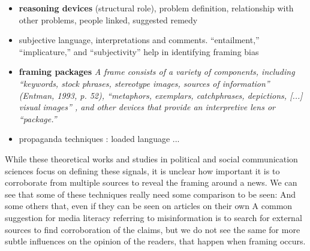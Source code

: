 \begin{itemize}
    \item \textbf{reasoning devices} (structural role), problem definition, relationship with other problems, people linked, suggested remedy \cite{entman1993framing} 
    
    \item subjective language, interpretations and comments. “entailment,” “implicature,” and “subjectivity” help in identifying framing bias \cite{baumer2015testing}
    
    \item \textbf{framing packages}  \textit{A frame consists of a variety of components, including “keywords, stock phrases, stereotype images, sources of information” (Entman, 1993, p. 52), “metaphors, exemplars, catchphrases, depictions, [...] visual images” \cite{gamson1989media}, and other devices that provide an interpretive lens or “package.”}
    
    \item propaganda techniques \cite{da2019fine}:
    loaded language
    ...
\end{itemize}



While these theoretical works and studies in political and social communication sciences focus on defining these signals, it is unclear how important it is to corroborate from multiple sources to reveal the framing around a news.
We can see that some of these techniques really need some comparison to be seen: 
And some others that, even if they can be seen on articles on their own
A common suggestion for media literacy referring to misinformation is to search for external sources to find corroboration of the claims, but we do not see the same for more subtle influences on the opinion of the readers, that happen when framing occurs.

